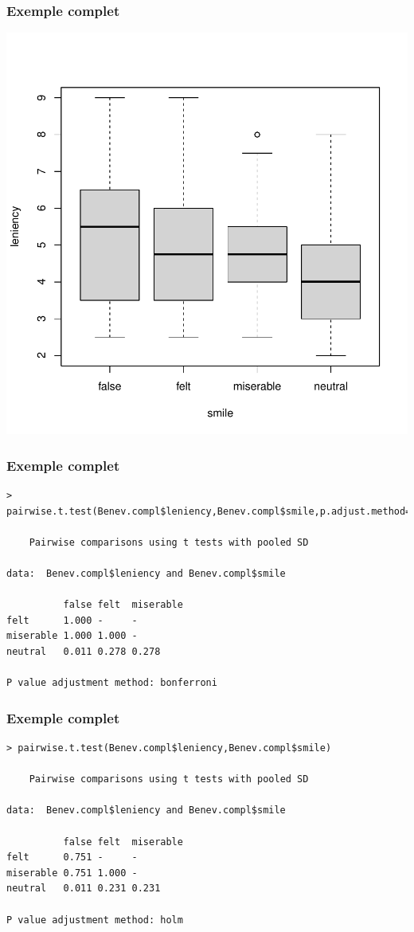 \documentclass[12pt,t]{beamer}
\theoremstyle{plain}
\theoremstyle{definition}
\begin{document}
\begin{frame}
\frametitle{Exemple complet} \vspace*{-2ex}


\begin{center}
\includegraphics[width=0.8\linewidth]{boxplot}
\end{center}
\end{frame}


\begin{frame}[fragile]
\frametitle{Exemple complet} 

\begin{lstlisting}
> pairwise.t.test(Benev.compl$leniency,Benev.compl$smile,p.adjust.method="bonferroni") 

	Pairwise comparisons using t tests with pooled SD 

data:  Benev.compl$leniency and Benev.compl$smile 

          false felt  miserable
felt      1.000 -     -        
miserable 1.000 1.000 -        
neutral   0.011 0.278 0.278    

P value adjustment method: bonferroni 
\end{lstlisting}
\end{frame}

\begin{frame}[fragile]
\frametitle{Exemple complet} 

\begin{lstlisting}
> pairwise.t.test(Benev.compl$leniency,Benev.compl$smile) 

	Pairwise comparisons using t tests with pooled SD 

data:  Benev.compl$leniency and Benev.compl$smile 

          false felt  miserable
felt      0.751 -     -        
miserable 0.751 1.000 -        
neutral   0.011 0.231 0.231    

P value adjustment method: holm 
\end{lstlisting}
\end{frame}
\end{document}
